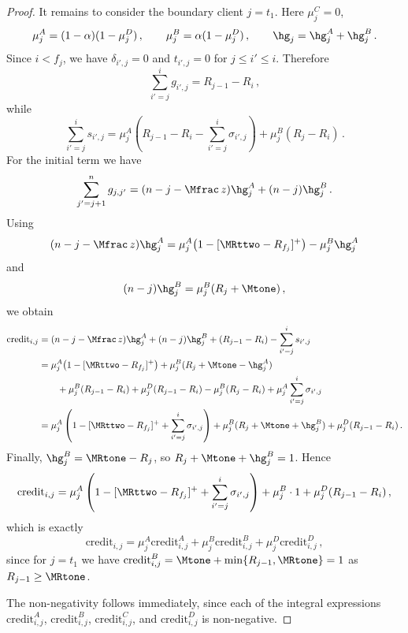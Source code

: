 \begin{proof}
    It remains to consider the boundary client $j=t_1$. Here $\mu_j^C=0$,
    \begin{equation*}
        \mu_j^A=(1-\alpha)(1-\mu_j^D)\,,
        \qquad
        \mu_j^B=\alpha(1-\mu_j^D)\,,
        \qquad
        \hg_j=\hg_j^A+\hg_j^B\,.
    \end{equation*}
    Since $i<f_j$, we have $\delta_{i',j}=0$ and $t_{i',j}=0$ for $j\le i'\le i$. Therefore
    \begin{equation*}
        \sum_{i'=j}^{i} g_{i',j}=R_{j-1}-R_i\,,
    \end{equation*}
    while
    \begin{equation*}
        \sum_{i'=j}^{i} s_{i',j}
        =\mu_j^A\left(R_{j-1}-R_i-\sum_{i'=j}^{i}\sigma_{i',j}\right)
        +\mu_j^B(R_j-R_i)\,.
    \end{equation*}
    For the initial term we have
    \begin{equation*}
        \sum_{j'=j+1}^{n} g_{j,j'}=(n-j-\Mfrac\, z)\hg_j^A+(n-j)\hg_j^B\,.
    \end{equation*}
    Using
    \begin{equation*}
        (n-j-\Mfrac\, z)\hg_j^A=
        \mu_j^A\bigl(1-[\MRttwo-R_{f_j}]^+\bigr)-\mu_j^B\hg_j^A
    \end{equation*}
    and
    \begin{equation*}
        (n-j)\hg_j^B=
        \mu_j^B(R_j+\Mtone)\,,
    \end{equation*}
    we obtain
    \begin{align*}
        \text{credit}_{i,j}
        &= (n-j-\Mfrac\, z)\hg_j^A+(n-j)\hg_j^B + (R_{j-1}-R_i) - \sum_{i'=j}^{i} s_{i',j} \\
        &= \mu_j^A\bigl(1-[\MRttwo-R_{f_j}]^+\bigr) + \mu_j^B(R_j+\Mtone-\hg_j^A) \\
        &\qquad + \mu_j^B(R_{j-1}-R_i) + \mu_j^D(R_{j-1}-R_i) - \mu_j^B(R_j-R_i) + \mu_j^A\sum_{i'=j}^{i}\sigma_{i',j} \\
        &= \mu_j^A\left(1-[\MRttwo-R_{f_j}]^+ + \sum_{i'=j}^{i}\sigma_{i',j}\right)
        + \mu_j^B(R_j+\Mtone+\hg_j^B)
        + \mu_j^D(R_{j-1}-R_i)\,.
    \end{align*}
    Finally, $\hg_j^B=\MRtone - R_j$, so $R_j+\Mtone+\hg_j^B=1$. Hence
    \begin{equation*}
        \text{credit}_{i,j}
        = \mu_j^A\left(1-[\MRttwo-R_{f_j}]^+ + \sum_{i'=j}^{i}\sigma_{i',j}\right)
        + \mu_j^B\cdot 1
        + \mu_j^D(R_{j-1}-R_i)\,,
    \end{equation*}
    which is exactly
    \begin{equation*}
        \text{credit}_{i,j}
        = \mu_j^A\text{credit}_{i,j}^A
        + \mu_j^B\text{credit}_{i,j}^B
        + \mu_j^D\text{credit}_{i,j}^D\,,
    \end{equation*}
    since for $j=t_1$ we have $\text{credit}_{i,j}^B=\Mtone+\min\{R_{j-1},\MRtone\}=1$ as $R_{j-1}\geq \MRtone$.

    The non-negativity follows immediately, since each of the integral expressions $\text{credit}_{i,j}^A$, $\text{credit}_{i,j}^B$, $\text{credit}_{i,j}^C$, and $\text{credit}_{i,j}^D$ is non-negative.
\end{proof}

